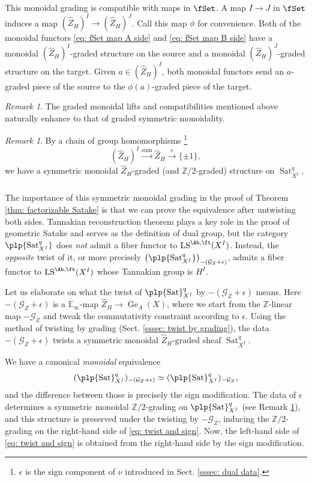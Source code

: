 \documentclass[10pt]{amsart}
\newcommand{\sssec}{\subsubsection}
\theoremstyle{remark}
\newtheorem{rmk}[subsubsection]{Remark}
\newcommand{\wh}{\widehat}
\newcommand{\E}{\mathbb{E}}
\newcommand{\Z}{\mathbb{Z}}
\newcommand{\on}{\operatorname}
\newcommand{\cG}{\mathcal{G}}
\newcommand{\LS}{\on{LS}}
\newcommand{\Sat}{\on{Sat}}
\begin{document}
This monoidal grading is compatible with maps in $\fSet$. A map $I\rightarrow J$ in $\fSet$ induces a map $(\wh{Z}_H)^I\rightarrow (\wh{Z}_H)^J$. Call this map $\phi$ for convenience. Both of the monoidal functors \eqref{eq: fSet map A side} and \eqref{eq: fSet map B side} have a monoidal $(\wh{Z}_H)^I$-graded structure on the source and a monoidal $(\wh{Z}_H)^J$-graded structure on the target. Given $a\in (\wh{Z}_H)^I$, both monoidal functors send an 
$a$-graded piece of the source to the $\phi(a)$-graded piece of the target. 

\begin{rmk}
    The graded monoidal lifts and compatibilities mentioned above naturally enhance to that of graded symmetric monoidality. 
\end{rmk}

\begin{rmk}\label{rmk: induced grading}
    By a chain of group homomorphisms \footnote{$\epsilon$ is the sign component of $\nu$ introduced in Sect. \ref{sssec: dual data}.}
    \[(\wh{Z}_H)^I\xrightarrow{\on{sum}}\wh{Z}_H\xrightarrow{\epsilon}\{\pm 1\},\]
    we have a symmetric monoidal $\wh{Z}_H$-graded (and $\Z/2$-graded) structure on $\Sat^q_{X^I}$.
\end{rmk}

\sssec{}\label{sssec: opposite twist}
The importance of this symmetric monoidal grading in the proof of Theorem \ref{thm: factorizable Satake} is that we can prove the equivalence after untwisting both sides. Tannakian reconstruction theorem plays a key role in the proof of geometric Satake and serves as the definition of dual group, but the category $\plp{\Sat^q_{X^I}}$ does \emph{not} admit a fiber functor to $\LS^{\Ab,\ft}(X^I)$. Instead, the \emph{opposite} twist of it, or more precisely $\left(\plp{\Sat^q_{X^I}}\right)_{-(\cG_Z+\epsilon)}$, admits a fiber functor to $\LS^{\Ab,\ft}(X^I)$ whose Tannakian group is $H^I$. 
\medskip

Let us elaborate on what the twist of $\plp{\Sat}^q_{X^I}$ by $-(\cG_Z+\epsilon)$ means. Here $-(\cG_Z+\epsilon)$ is a $\E_{\infty}$-map $\wh{Z}_H\rightarrow \on{Ge}_A(X)$, where we start from the $\Z$-linear map $-\cG_Z$ and tweak the commutativity constraint according to $\epsilon$. Using the method of twisting by grading (Sect. \ref{sssec: twist by grading}), the data $-(\cG_Z+\epsilon)$ twists a symmetric monoidal $\wh{Z}_H$-graded sheaf $\Sat^q_{X^I}$.
\medskip

We have a canonical \emph{monoidal} equivalence
\begin{equation}\label{eq: twist and sign}
    (\plp{\Sat}^q_{X^I})_{-(\cG_Z+\epsilon)}\simeq (\plp{\Sat}^q_{X^I})_{-\cG_Z},
\end{equation}
and the difference between those is precisely the sign modification. The data of $\epsilon$ determines a symmetric monoidal $\Z/2$-grading on $\plp{\Sat}^q_{X^I}$ (see Remark \ref{rmk: induced grading}), and this structure is preserved under the twisting by $-\cG_Z$, inducing the $\Z/2$-grading on the right-hand side of \eqref{eq: twist and sign}. Now, the left-hand side of \eqref{eq: twist and sign} is obtained from the right-hand side by the sign modification.
\end{document}
